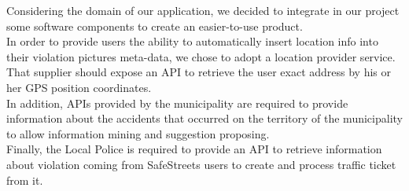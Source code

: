 Considering the domain of our application, we  decided to integrate in our project some software components to create an easier-to-use product. 
\\In order to provide users the ability to automatically insert location info into their violation pictures meta-data, we chose to adopt a location provider service. That supplier should expose an API to retrieve the user exact address by his or her GPS position coordinates. 
\\In addition, APIs provided by the municipality are required to provide information about the accidents	that	occurred	on	the	territory	of	the	municipality to allow information mining and suggestion proposing.
\\Finally, the Local Police is required to provide an API to retrieve information about violation coming from SafeStreets users to create and process traffic ticket from it.
\clearpage